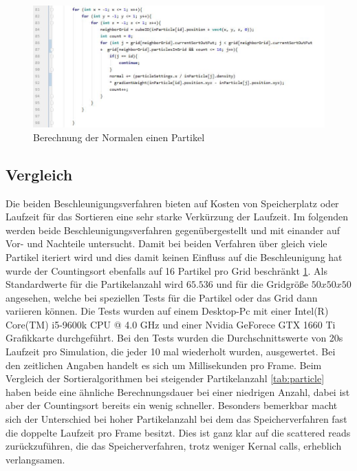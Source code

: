 \documentclass[intern,palatino]{cgBA}
\begin{document}
\begin{figure}[H]
	\centering
	\includegraphics[width=1.3\columnwidth]{Bilder/normal.jpg}
	\caption{Berechnung der Normalen einen Partikel}
	\label{img:normal}
\end{figure}


\subsection{Vergleich}\label{vergleich}

Die beiden Beschleunigungsverfahren bieten auf Kosten von Speicherplatz oder Laufzeit für das Sortieren eine sehr starke Verkürzung der Laufzeit. Im folgenden werden beide Beschleunigungsverfahren gegenübergestellt und mit einander auf Vor- und Nachteile untersucht.
\newline
Damit bei beiden Verfahren über gleich viele Partikel iteriert wird und dies damit keinen Einfluss auf die Beschleunigung hat wurde der Countingsort ebenfalls auf 16 Partikel pro Grid beschränkt \ref{img:normal}. Als Standardwerte für die Partikelanzahl wird $65.536$ und für die Gridgröße $50x50x50$ angesehen, welche bei speziellen Tests für die Partikel oder das Grid dann variieren können.
\newline
Die Tests wurden auf einem Desktop-Pc mit einer Intel(R) Core(TM) i5-9600k CPU @ 4.0 GHz und einer Nvidia GeForece GTX 1660 Ti Grafikkarte durchgeführt. Bei den Tests wurden die Durchschnittswerte von 20s Laufzeit pro Simulation, die jeder 10 mal wiederholt wurden, ausgewertet. Bei den zeitlichen Angaben handelt es sich um Millisekunden pro Frame.
\newline
Beim Vergleich der Sortieralgorithmen bei steigender Partikelanzahl \ref{tab:particle} haben beide eine ähnliche Berechnungsdauer bei einer niedrigen Anzahl, dabei ist aber der Countingsort bereits ein wenig schneller. Besonders bemerkbar macht sich der Unterschied bei hoher Partikelanzahl bei dem das Speicherverfahren fast die doppelte Laufzeit pro Frame besitzt. Dies ist ganz klar auf die scattered reads zurückzuführen, die das Speicherverfahren, trotz weniger Kernal calls, erheblich verlangsamen.
\newline
\end{document}
